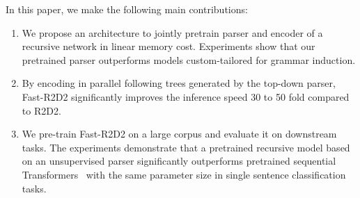 In this paper, we make the following main contributions:
\begin{enumerate}
    \item We propose an architecture to jointly pretrain parser and encoder of a recursive network in linear memory cost. Experiments show that our pretrained parser outperforms models custom-tailored for grammar induction.
    \item By encoding in parallel following trees generated by the top-down parser, Fast-R2D2 significantly improves the inference speed 30 to 50 fold compared to R2D2.
    \item We pre-train Fast-R2D2 on a large corpus and evaluate it on downstream tasks. The experiments demonstrate that a pretrained recursive model based on an unsupervised parser significantly outperforms pretrained sequential Transformers~\cite{DBLP:conf/nips/VaswaniSPUJGKP17} with the same parameter size in single sentence classification tasks.
\end{enumerate}


